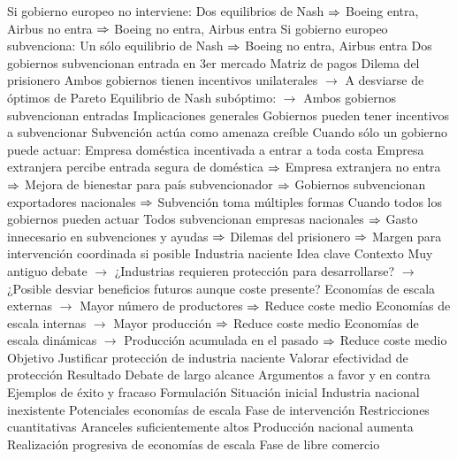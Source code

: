 \documentclass{nuevotema}
\begin{document}
\begin{esquemal}
				\4[] 
				\4 Si gobierno europeo no interviene:
				\4[] Dos equilibrios de Nash
				\4[] $\Rightarrow$ Boeing entra, Airbus no entra
				\4[] $\Rightarrow$ Boeing no entra, Airbus entra
				\4 Si gobierno europeo subvenciona:
				\4[] Un sólo equilibrio de Nash
				\4[] $\Rightarrow$ Boeing no entra, Airbus entra
			\3 Dos gobiernos subvencionan entrada en 3er mercado
				\4 Matriz de pagos
				\4[] 
				\4 Dilema del prisionero
				\4[] Ambos gobiernos tienen incentivos unilaterales
				\4[] $\to$ A desviarse de óptimos de Pareto
				\4[] Equilibrio de Nash subóptimo:
				\4[] $\to$ Ambos gobiernos subvencionan entradas
			\3 Implicaciones generales
				\4 Gobiernos pueden tener incentivos a subvencionar
				\4[] Subvención actúa como amenaza creíble
				\4 Cuando sólo un gobierno puede actuar:
				\4[] Empresa doméstica incentivada a entrar a toda costa
				\4[] Empresa extranjera percibe entrada segura de doméstica
				\4[] $\Rightarrow$ Empresa extranjera no entra
				\4[] $\Rightarrow$ Mejora de bienestar para país subvencionador
				\4[] $\Rightarrow$ Gobiernos subvencionan exportadores nacionales
				\4[] $\Rightarrow$ Subvención toma múltiples formas
				\4 Cuando todos los gobiernos pueden actuar
				\4[] Todos subvencionan empresas nacionales
				\4[] $\Rightarrow$ Gasto innecesario en subvenciones y ayudas
				\4[] $\Rightarrow$ Dilemas del prisionero
				\4[] $\Rightarrow$ Margen para intervención coordinada si posible
		\2 Industria naciente
			\3 Idea clave
				\4 Contexto
				\4[] Muy antiguo debate
				\4[] $\to$ ¿Industrias requieren protección para desarrollarse?
				\4[] $\to$ ¿Posible desviar beneficios futuros aunque coste presente?
				\4[] Economías de escala externas
				\4[] $\to$ Mayor número de productores
				\4[] $\Rightarrow$ Reduce coste medio
				\4[] Economías de escala internas
				\4[] $\to$ Mayor producción
				\4[] $\Rightarrow$ Reduce coste medio
				\4[] Economías de escala dinámicas
				\4[] $\to$ Producción acumulada en el pasado
				\4[] $\Rightarrow$ Reduce coste medio
				\4 Objetivo
				\4[] Justificar protección de industria naciente
				\4[] Valorar efectividad de protección
				\4 Resultado
				\4[] Debate de largo alcance
				\4[] Argumentos a favor y en contra
				\4[] Ejemplos de éxito y fracaso
			\3 Formulación
				\4 Situación inicial
				\4[] Industria nacional inexistente
				\4[] Potenciales economías de escala
				\4 Fase de intervención
				\4[] Restricciones cuantitativas
				\4[] Aranceles suficientemente altos
				\4[] Producción nacional aumenta
				\4[] Realización progresiva de economías de escala
				\4 Fase de libre comercio

\end{esquemal}
\end{document}

